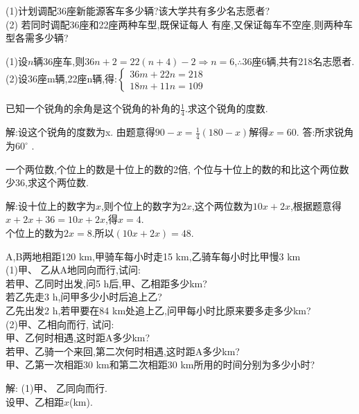 \documentclass[cn,blue,12pt]{elegantbook}
\begin{document}
\begin{liti}[resume]
    (1)计划调配36座新能源客车多少辆?该大学共有多少名志愿者?\\
    (2) 若同时调配36座和22座两种车型,既保证每人 有座,又保证每车不空座,则两种车型各需多少辆?
\begin{solution}
        (1)设\(n\)辆36座车,则\(36n+2=22(n+4)-2 \Rightarrow n=6\),\(\therefore \)36座6辆,共有218名志愿者.\\
        (2)设36座m辆,22座n辆,得:\(\begin{cases} 36m+22n=218\\ 18m+11n=109\end{cases}\)
\end{solution}

\item 已知一个锐角的余角是这个锐角的补角的\(\frac{1}{4}\).求这个锐角的度数.
\begin{solution}
        解:设这个锐角的度数为x.
        由题意得\(90-x=\frac{1}{4}(180-x)\)解得\(x=60\).
        答:所求锐角为\(60 ^\circ\) .
\end{solution}
\item 一个两位数,个位上的数是十位上的数的2倍, 个位与十位上的数的和比这个两位数少36,求这个两位数.
\begin{solution}
        解:设十位上的数字为\(x\),则个位上的数字为\(2x\),这个两位数为\(10x+2x\),根据题意得\(x+2x+36=10x + 2x\),得\(x=4\).\\
        个位上的数为\(2x=8\).所以\((10x + 2x)=48\).
\end{solution}
\item  A,B两地相距120 km,甲骑车每小时走15 km,乙骑车每小时比甲慢3 km\\
    (1)甲、 乙从A地同向而行,试问:\\
 若甲、乙同时出发,问5 h后,甲、乙相距多少km?\\
 若乙先走3 h,问甲多少小时后追上乙?\\
  乙先出发2 h,若甲要在84 km处追上乙,问甲每小时比原来要多走多少km?\\
(2)甲、乙相向而行, 试问:\\
  甲、乙何时相遇,这时距A多少km?\\
 若甲、乙骑一个来回,第二次何时相遇,这时距A多少km?\\
  甲、乙第一次相距30 km和第二次相距30 km所用的时间分别为多少小时?\\
\begin{solution}
     解: (1)甲、 乙同向而行.\\
     设甲、乙相距\(x\)(km).\\

\end{solution}
\end{liti}
\end{document}
